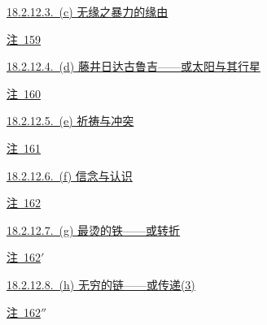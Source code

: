 \par\noindent\hspace*{2.70em}\hyperref[ch18:local:h73]{18.2.12.3.~(c) 无缘之暴力的缘由}\nobreak\dotfill\nobreak\hyperref[ch18:local:h73]{\pageref*{ch18:local:h73}}\par
\par\noindent\hspace*{4.05em}\hyperref[ch18:local:n68]{注~159}\nobreak\dotfill\nobreak\hyperref[ch18:local:n68]{\pageref*{ch18:local:n68}}\par
\par\noindent\hspace*{2.70em}\hyperref[ch18:local:h74]{18.2.12.4.~(d) 藤井日达古鲁吉——或太阳与其行星}\nobreak\dotfill\nobreak\hyperref[ch18:local:h74]{\pageref*{ch18:local:h74}}\par
\par\noindent\hspace*{4.05em}\hyperref[ch18:local:n69]{注~160}\nobreak\dotfill\nobreak\hyperref[ch18:local:n69]{\pageref*{ch18:local:n69}}\par
\par\noindent\hspace*{2.70em}\hyperref[ch18:local:h75]{18.2.12.5.~(e) 祈祷与冲突}\nobreak\dotfill\nobreak\hyperref[ch18:local:h75]{\pageref*{ch18:local:h75}}\par
\par\noindent\hspace*{4.05em}\hyperref[ch18:local:n70]{注~161}\nobreak\dotfill\nobreak\hyperref[ch18:local:n70]{\pageref*{ch18:local:n70}}\par
\par\noindent\hspace*{2.70em}\hyperref[ch18:local:h76]{18.2.12.6.~(f) 信念与认识}\nobreak\dotfill\nobreak\hyperref[ch18:local:h76]{\pageref*{ch18:local:h76}}\par
\par\noindent\hspace*{4.05em}\hyperref[ch18:local:n71]{注~162}\nobreak\dotfill\nobreak\hyperref[ch18:local:n71]{\pageref*{ch18:local:n71}}\par
\par\noindent\hspace*{2.70em}\hyperref[ch18:local:h77]{18.2.12.7.~(g) 最烫的铁——或转折}\nobreak\dotfill\nobreak\hyperref[ch18:local:h77]{\pageref*{ch18:local:h77}}\par
\par\noindent\hspace*{4.05em}\hyperref[ch18:local:n72]{注~162$'$}\nobreak\dotfill\nobreak\hyperref[ch18:local:n72]{\pageref*{ch18:local:n72}}\par
\par\noindent\hspace*{2.70em}\hyperref[ch18:local:h78]{18.2.12.8.~(h) 无穷的链——或传递(3)}\nobreak\dotfill\nobreak\hyperref[ch18:local:h78]{\pageref*{ch18:local:h78}}\par
\par\noindent\hspace*{4.05em}\hyperref[ch18:local:n73]{注~162$''$}\nobreak\dotfill\nobreak\hyperref[ch18:local:n73]{\pageref*{ch18:local:n73}}\par
\endgroup\medskip
